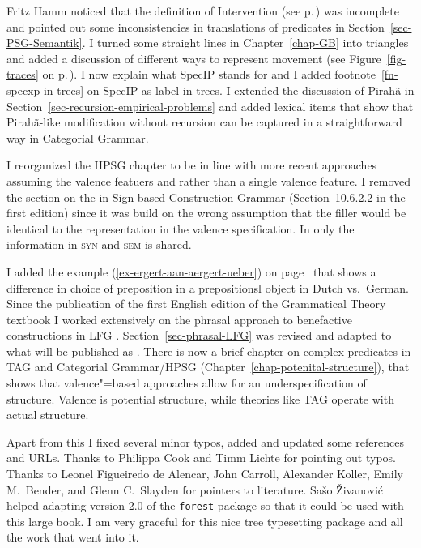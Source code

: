 Fritz Hamm noticed that the definition of Intervention (see p.\,\pageref{def-intervention}) was
incomplete and pointed out some inconsistencies in translations of predicates in
Section~\ref{sec-PSG-Semantik}. 
%
%
%
I turned some straight lines in Chapter~\ref{chap-GB} into triangles and added a discussion of
different ways to represent movement (see Figure~\ref{fig-traces} on p.\,\pageref{fig-traces}).
%
I now explain what SpecIP stands for and I added footnote~\ref{fn-specxp-in-trees} on SpecIP as label in trees.
%
%
I extended the discussion of Pirahã in Section~\ref{sec-recursion-empirical-problems} and added
lexical items that show that Pirahã-like modification without recursion can be captured in a
straightforward way in Categorial Grammar. 

I reorganized the HPSG chapter to be in line with more recent approaches assuming the valence
featuers \spr and \comps \citep{Sag97a,MuellerGermanic} rather than a single valence feature.
I removed the section on the \localf in Sign-based Construction Grammar (Section~10.6.2.2 in the
first edition) since it was build on the wrong assumption that the filler would be identical to the
representation in the valence specification. In \citet[]{Sag2012a} only the information in
\textsc{syn} and \textsc{sem} is shared. 

I added the example (\ref{ex-ergert-aan-aergert-ueber}) on
page~\pageref{ex-ergert-aan-aergert-ueber} that shows a difference in choice of preposition in a
prepositionsl object in Dutch vs.\ German. Since the publication of the first English edition of the
Grammatical Theory textbook I worked extensively on the phrasal approach to benefactive
constructions in LFG \citep*{AGT2014a}. Section~\ref{sec-phrasal-LFG} was
revised and adapted to what will be published as .
There is now a brief chapter on complex predicates in TAG
and Categorial Grammar/HPSG (Chapter~\ref{chap-potenital-structure}), that shows that valence"=based
approaches allow for an underspecification of structure. Valence is potential structure, while
theories like TAG operate with actual structure.  

Apart from this I fixed several minor typos, added and updated some references and URLs. Thanks to
Philippa Cook and Timm Lichte for pointing out typos. Thanks to 
Leonel Figueiredo de Alencar,
John Carroll,
Alexander Koller,
Emily M.\ Bender,
and
Glenn C.\ Slayden
for pointers to literature.
%
Sašo Živanović helped adapting version 2.0 of
the \texttt{forest} package so that it could be used with this large book. I am very graceful for
this nice tree typesetting package and all the work that went into it.

